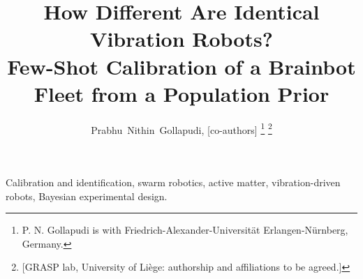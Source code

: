 \documentclass[journal]{IEEEtran}
\begin{document}
\title{How Different Are Identical Vibration Robots?\\
Few-Shot Calibration of a Brainbot Fleet from a Population Prior}

\author{Prabhu~Nithin~Gollapudi,
        [co-authors]%
\thanks{P. N. Gollapudi is with Friedrich-Alexander-Universit\"at Erlangen-N\"urnberg, Germany.}%
\thanks{[GRASP lab, University of Li\`ege: authorship and affiliations to be agreed.]}}


\maketitle

\begin{abstract}

\end{abstract}

\begin{IEEEkeywords}
Calibration and identification, swarm robotics, active matter, vibration-driven robots, Bayesian experimental design.
\end{IEEEkeywords}














\end{document}
